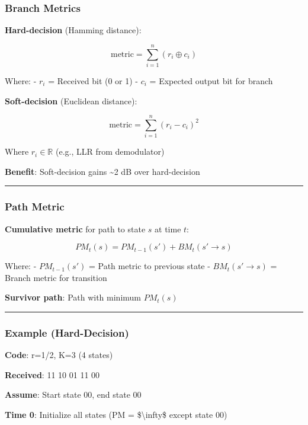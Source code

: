 \subsubsection{Branch Metrics}\label{branch-metrics}

\textbf{Hard-decision} (Hamming distance):

\[
\text{metric} = \sum_{i=1}^{n} (r_i \oplus c_i)
\]

Where: - \(r_i\) = Received bit (0 or 1) - \(c_i\) = Expected output bit
for branch

\textbf{Soft-decision} (Euclidean distance):

\[
\text{metric} = \sum_{i=1}^{n} (r_i - c_i)^2
\]

Where \(r_i \in \mathbb{R}\) (e.g., LLR from demodulator)

\textbf{Benefit}: Soft-decision gains \textasciitilde2 dB over
hard-decision

\begin{center}\rule{0.5\linewidth}{0.5pt}\end{center}

\subsubsection{Path Metric}\label{path-metric}

\textbf{Cumulative metric} for path to state \(s\) at time \(t\):

\[
PM_t(s) = PM_{t-1}(s') + BM_t(s' \to s)
\]

Where: - \(PM_{t-1}(s')\) = Path metric to previous state -
\(BM_t(s' \to s)\) = Branch metric for transition

\textbf{Survivor path}: Path with minimum \(PM_t(s)\)

\begin{center}\rule{0.5\linewidth}{0.5pt}\end{center}

\subsubsection{Example (Hard-Decision)}\label{example-hard-decision}

\textbf{Code}: r=1/2, K=3 (4 states)

\textbf{Received}: 11 10 01 11 00

\textbf{Assume}: Start state 00, end state 00

\textbf{Time 0}: Initialize all states (PM = \$\textbackslash infty\$
except state 00)

